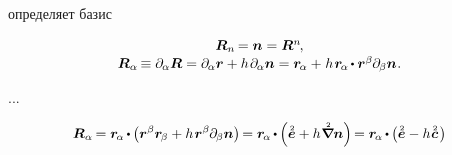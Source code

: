 \begin{otherlanguage}{russian}
\vspace{-0.5em} \noindent определяет базис

\nopagebreak\vspace{-0.8em}\begin{equation*}
\begin{array}{c}
\bm{R}_n \hspace{-0.2ex} = \bm{n} = \bm{R}^n \hspace{-0.25ex} ,
\\[.1em]
\bm{R}_\alpha \hspace{-0.2ex} \equiv \partial_{\hspace{-0.1ex}\alpha} \bm{R}
= \partial_{\hspace{-0.1ex}\alpha} \bm{r} + h \hspace{.2ex} \partial_{\hspace{-0.1ex}\alpha} \bm{n}
= \bm{r}_{\hspace{-0.2ex}\alpha} + \hspace{.1ex} h \hspace{.2ex} \bm{r}_{\hspace{-0.2ex}\alpha} \hspace{-0.2ex} \dotp \bm{r}^\beta \hspace{-0.1ex} \partial_{\hspace{-0.1ex}\beta} \bm{n}
\hspace{.1ex} .
\end{array}
\end{equation*}

...

\[
\bm{R}_\alpha \hspace{-0.2ex}
= \bm{r}_{\hspace{-0.2ex}\alpha} \hspace{-0.15ex} \dotp \hspace{-0.1ex}
\left(
\bm{r}^\beta \bm{r}_{\hspace{-0.2ex}\beta}
+ h \hspace{.2ex} \bm{r}^\beta \hspace{-0.1ex} \partial_{\hspace{-0.1ex}\beta} \bm{n}
\right) \hspace{-0.25ex}
= \bm{r}_{\hspace{-0.2ex}\alpha} \hspace{-0.15ex} \dotp \hspace{-0.1ex}
\left(
\mathtwoabove{\bm{e}} + h \hspace{.1ex} \boldnablaflat \bm{n}
\right) \hspace{-0.25ex}
= \bm{r}_{\hspace{-0.2ex}\alpha} \hspace{-0.15ex} \dotp \hspace{-0.1ex}
\left(
\mathtwoabove{\bm{e}} - h \hspace{.1ex} \mathtwoabove{\bm{c}}
\hspace{.2ex} \right)
\]


\end{otherlanguage}
